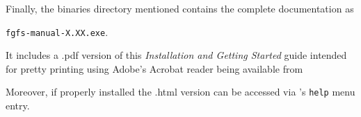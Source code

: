 Finally, the binaries directory mentioned contains the complete \FlightGear documentation
as

\texttt{fgfs-manual-X.XX.exe}.

It includes a .pdf version of this \textit{Installation and Getting Started} guide
intended for pretty printing using Adobe's Acrobat reader being available from


Moreover, if properly installed the .html version can be accessed via \FlightGear's
\texttt{help} menu entry.


